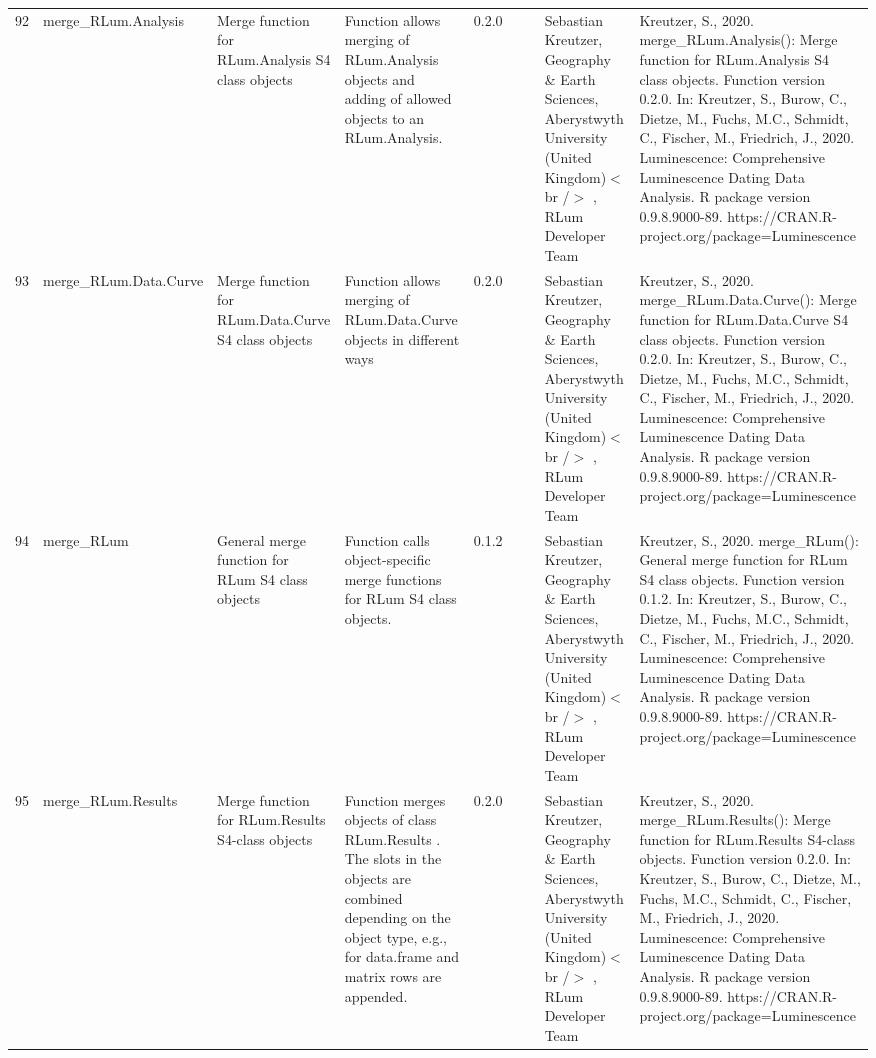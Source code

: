 \begin{table}[ht]
\begin{tabular}{rllllllll}
 \\ 
  92 & merge\_RLum.Analysis & Merge function for RLum.Analysis S4 class objects & Function allows merging of RLum.Analysis objects and adding of allowed objects to an RLum.Analysis. & 0.2.0
 &  &  & Sebastian Kreutzer, Geography \& Earth Sciences, Aberystwyth University (United Kingdom)$<$br /$>$ , RLum Developer Team & Kreutzer, S., 2020. merge\_RLum.Analysis(): Merge function for RLum.Analysis S4 class objects. Function version 0.2.0. In: Kreutzer, S., Burow, C., Dietze, M., Fuchs, M.C., Schmidt, C., Fischer, M., Friedrich, J., 2020. Luminescence: Comprehensive Luminescence Dating Data Analysis. R package version 0.9.8.9000-89. https://CRAN.R-project.org/package=Luminescence
 \\ 
  93 & merge\_RLum.Data.Curve & Merge function for RLum.Data.Curve S4 class objects & Function allows merging of RLum.Data.Curve objects in different ways & 0.2.0
 &  &  & Sebastian Kreutzer, Geography \& Earth Sciences, Aberystwyth University (United Kingdom)$<$br /$>$ , RLum Developer Team & Kreutzer, S., 2020. merge\_RLum.Data.Curve(): Merge function for RLum.Data.Curve S4 class objects. Function version 0.2.0. In: Kreutzer, S., Burow, C., Dietze, M., Fuchs, M.C., Schmidt, C., Fischer, M., Friedrich, J., 2020. Luminescence: Comprehensive Luminescence Dating Data Analysis. R package version 0.9.8.9000-89. https://CRAN.R-project.org/package=Luminescence
 \\ 
  94 & merge\_RLum & General merge function for RLum S4 class objects & Function calls object-specific merge functions for RLum S4 class objects. & 0.1.2
 &  &  & Sebastian Kreutzer, Geography \& Earth Sciences, Aberystwyth University (United Kingdom)$<$br /$>$ , RLum Developer Team & Kreutzer, S., 2020. merge\_RLum(): General merge function for RLum S4 class objects. Function version 0.1.2. In: Kreutzer, S., Burow, C., Dietze, M., Fuchs, M.C., Schmidt, C., Fischer, M., Friedrich, J., 2020. Luminescence: Comprehensive Luminescence Dating Data Analysis. R package version 0.9.8.9000-89. https://CRAN.R-project.org/package=Luminescence
 \\ 
  95 & merge\_RLum.Results & Merge function for RLum.Results S4-class objects & Function merges objects of class  RLum.Results . The slots in the objects are combined depending on the object type, e.g., for  data.frame  and  matrix  rows are appended. & 0.2.0
 &  &  & Sebastian Kreutzer, Geography \& Earth Sciences, Aberystwyth University (United Kingdom)$<$br /$>$ , RLum Developer Team & Kreutzer, S., 2020. merge\_RLum.Results(): Merge function for RLum.Results S4-class objects. Function version 0.2.0. In: Kreutzer, S., Burow, C., Dietze, M., Fuchs, M.C., Schmidt, C., Fischer, M., Friedrich, J., 2020. Luminescence: Comprehensive Luminescence Dating Data Analysis. R package version 0.9.8.9000-89. https://CRAN.R-project.org/package=Luminescence

\end{tabular}
\end{table}
